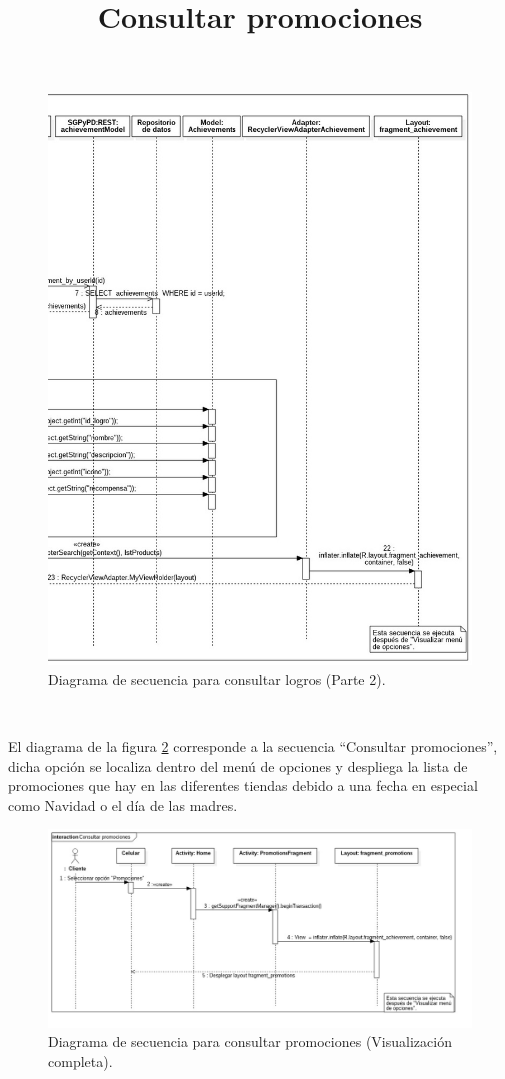 \FloatBarrier
\begin{figure}[htbp!]
		\centering
			\includegraphics[width=.9 \textwidth]{imagenes/Diagramas_UserApp/Nuevos_diagramas/Logros2}
		\caption{Diagrama de secuencia para consultar logros (Parte 2).}
		\label{image:DSConsultarLogros3}
\end{figure}
\FloatBarrier
\newpage
\title{\textbf{Consultar promociones}}
\\ \par
El diagrama de la figura \ref{image:DSConsultarPromociones1} corresponde a la secuencia ``Consultar promociones'', dicha opción se localiza dentro del menú de opciones y despliega la lista de promociones que hay en las diferentes tiendas debido a una fecha en especial como Navidad o el día de las madres.
\FloatBarrier
\begin{figure}[htbp!]
		\centering
			\includegraphics[width=1.1 \textwidth]{imagenes/Diagramas_UserApp/Nuevos_diagramas/Promociones}
		\caption{Diagrama de secuencia para consultar promociones (Visualización completa).}
		\label{image:DSConsultarPromociones1}
\end{figure}
\FloatBarrier

